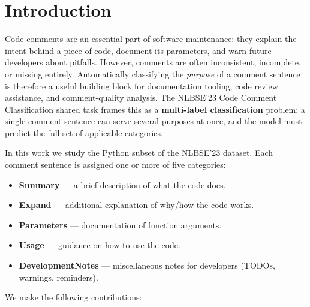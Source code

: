 \documentclass[11pt,a4paper]{article}
\begin{document}
\setcounter{tocdepth}{2}
\tableofcontents
\newpage

\section{Introduction}
\label{sec:introduction}

Code comments are an essential part of software maintenance: they explain the
intent behind a piece of code, document its parameters, and warn future
developers about pitfalls. However, comments are often inconsistent, incomplete,
or missing entirely. Automatically classifying the \emph{purpose} of a comment
sentence is therefore a useful building block for documentation tooling, code
review assistance, and comment-quality analysis. The NLBSE'23 Code Comment
Classification shared task \cite{nlbse2023} frames this as a \textbf{multi-label
classification} problem: a single comment sentence can serve several purposes at
once, and the model must predict the full set of applicable categories.

In this work we study the Python subset of the NLBSE'23 dataset. Each comment
sentence is assigned one or more of five categories:

\begin{itemize}[nosep]
    \item \textbf{Summary} --- a brief description of what the code does.
    \item \textbf{Expand} --- additional explanation of why/how the code works.
    \item \textbf{Parameters} --- documentation of function arguments.
    \item \textbf{Usage} --- guidance on how to use the code.
    \item \textbf{DevelopmentNotes} --- miscellaneous notes for developers
          (TODOs, warnings, reminders).
\end{itemize}

We make the following contributions:
\end{document}
